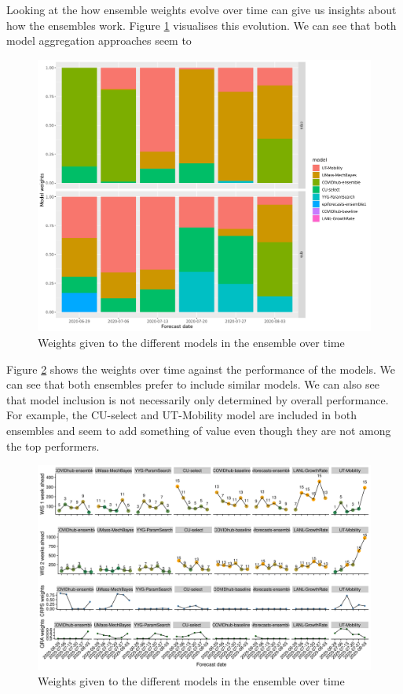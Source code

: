 \documentclass[
]{book}
\begin{document}
Looking at the how ensemble weights evolve over time can give us insights about how the ensembles work. Figure \ref{fig:weights-time} visualises this evolution. We can see that both model aggregation approaches seem to

\begin{figure}
\includegraphics[width=1\linewidth]{../visualisation/chapter-5-results/weights-time} \caption{Weights given to the different models in the ensemble over time}\label{fig:weights-time}
\end{figure}

Figure \ref{fig:weights-vs-scores} shows the weights over time against the performance of the models. We can see that both ensembles prefer to include similar models. We can also see that model inclusion is not necessarily only determined by overall performance. For example, the CU-select and UT-Mobility model are included in both ensembles and seem to add something of value even though they are not among the top performers.

\begin{figure}
\includegraphics[width=1\linewidth]{../visualisation/chapter-5-results/weights-vs-wis} \caption{Weights given to the different models in the ensemble over time}\label{fig:weights-vs-scores}
\end{figure}
\end{document}
